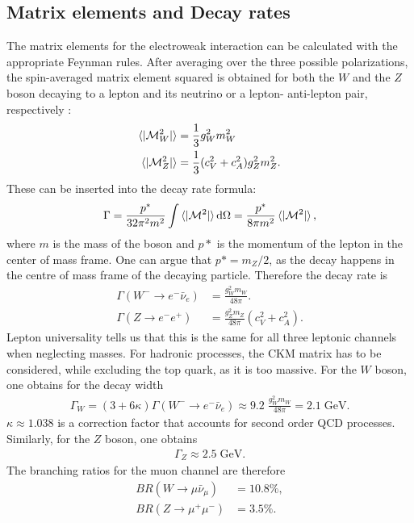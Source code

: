 \documentclass[twoside,        %
               BCOR12mm,       %
               ngerman,english, %
               fleqn,headsepline=false,footsepline=false
              ]{Vorlage/MFPREPORT}
\renewcommand{\d}{\ensuremath{\mathrm{d}}} %
\begin{document}
\subsection{Matrix elements and Decay rates}
The matrix elements for the electroweak interaction can be calculated with the
appropriate Feynman rules.
After averaging over the three possible polarizations, the spin-averaged matrix
element squared is obtained for both the $W$ and the $Z$ boson decaying to a
lepton and its neutrino or a lepton- anti-lepton pair, respectively
\cite[p.;242,411]{thomson}:
\begin{align}
    \label{eq:spinavg}
    \braket{|\mathcal{M}_W^2|}&=\frac{1}{3}g_W^2m_W^2\\
    \braket{|\mathcal{M}_Z^2|}&=\frac{1}{3}(c_V^2+c_A^2)g_Z^2m_Z^2.
\end{align}
These can be inserted into the decay rate formula: \cite[p.]{thomson}
\begin{align}
    \label{eq:decayrate}
    \Gamma=\frac{p^*}{32\pi^2m^2}\int
    \braket{|\mathcal{M}^2|}\d\Omega=\frac{p^*}{8\pi m^2}
    \braket{|\mathcal{M}^2|},
\end{align}
where $m$ is the mass of the boson and $p*$ is the momentum of the lepton in
the center of mass frame.
One can argue that $p*=m_Z/2$, as the
decay happens in the centre of mass frame of the decaying particle.
Therefore the decay rate is 
\begin{align}
    \label{eq:decay}
    \Gamma(W^-\rightarrow e^- \bar{\nu}_e)&=\frac{g_W^2m_W}{48\pi}.\\
    \Gamma(Z\rightarrow e^- e^+)&=\frac{g_Z^2m_Z}{48\pi}(c_V^2+c_A^2).
\end{align}
Lepton universality tells us that this is the same for all three leptonic
channels when neglecting masses. For hadronic processes, the CKM matrix has to
be considered, while excluding the top quark, as it is too massive.
For the $W$ boson, one obtains for the decay width \cite{thomson} 
\begin{align}
\Gamma_W=(3+6 \kappa)\Gamma(W^-\rightarrow e^-
\bar\nu_e)\approx9.2\;\frac{g_W^2m_W}{48\pi}=2.1\;\text{GeV.}
    \label{eq:gammaw}
\end{align}
$\kappa\approx1.038$ is a correction factor that accounts for second order QCD processes.
Similarly, for the $Z$ boson, one obtains
\begin{align}
    \Gamma_Z\approx2.5\;\text{GeV.}    \label{eq:gammaZ}
\end{align}
The branching ratios for the muon channel are therefore
\begin{align}
    BR(W\rightarrow\mu\bar\nu_\mu)&=10.8\%,\\
    BR(Z\rightarrow\mu^+\mu^-)&=3.5\%.
    \label{eq:branches}
\end{align}
\end{document}
